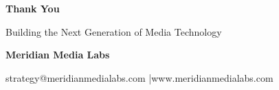 \documentclass[aspectratio=169,11pt]{beamer}
\begin{document}
{
\begin{frame}[plain]
  \vspace*{36pt}
  \begin{center}
    {\fontsize{32pt}{38pt}\selectfont \color{white}\bfseries Thank You} \par
    \vspace{10pt}
    {\fontsize{15pt}{20pt}\selectfont \color{accentcyan} Building the Next Generation of Media Technology} \par
    \vspace{24pt}
    \vspace{24pt}
    
    {\small\color{white}\bfseries Meridian Media Labs} \par
    \vspace{4pt}
    {\small\color{textlight}\faEnvelope\quad strategy@meridianmedialabs.com \quad|\quad \faGlobe\quad www.meridianmedialabs.com}
  \end{center}
\end{frame}
}
\end{document}
